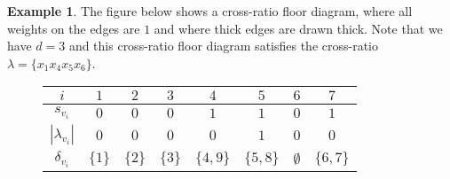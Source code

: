 \documentclass[11pt,reqno,a4]{amsart}
\theoremstyle{dotless}
\theoremstyle{definition}
\newtheorem{example}[corollary]{Example}
\begin{document}
\begin{example}\label{Example:cross_ratio_floor_diagram}
The figure below shows a cross-ratio floor diagram, where all weights on the edges are $1$ and where thick edges are drawn thick. Note that we have $d=3$ and this cross-ratio floor diagram satisfies the cross-ratio $\lambda=\lbrace x_1x_4x_5x_6 \rbrace$.


\begin{figure}[H]
\centering\hspace*{1.5cm}
\def\svgwidth{300pt}

\label{Example_cross_ratio_floor_diagram}


\setlength{\tabcolsep}{1.5em}
\renewcommand{\arraystretch}{1.3} 
\begin{table}[H]
  \centering
      \centering
      \begin{tabular}{*{8}{|c}|}\hline
        $i$ & $1$&$2$&$3$&$4$&$5$&$6$&$7$ \\\hline
        $s_{v_i}$ & $0$ & $0$ & $0$ & $1$ & $1$& $0$& $1$ \\\hline
        $|\lambda_{v_i}|$& $0$ & $0$ & $0$ & $0$ & $1$& $0$& $0$ \\\hline
        $\delta_{v_i}$ & $\lbrace 1 \rbrace$ & $\lbrace 2 \rbrace$ & $\lbrace 3 \rbrace$ & $\lbrace 4,9 \rbrace$ & $\lbrace 5,8 \rbrace$ & $\emptyset$ & $\lbrace 6,7 \rbrace$ \\\hline
      \end{tabular}
\end{table}
\end{figure}
\end{example}
\end{document}
